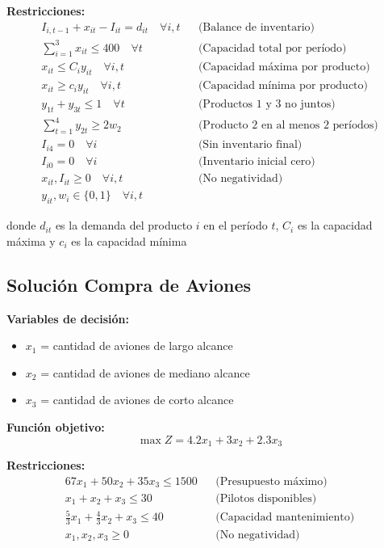 \documentclass[12pt]{article}
\begin{document}
\textbf{Restricciones:}
\begin{align*}
    I_{i,t-1} + x_{it} - I_{it} = d_{it} \quad \forall i,t && \text{(Balance de inventario)} \\
    \sum_{i=1}^{3} x_{it} \leq 400 \quad \forall t && \text{(Capacidad total por período)} \\
    x_{it} \leq C_i y_{it} \quad \forall i,t && \text{(Capacidad máxima por producto)} \\
    x_{it} \geq c_i y_{it} \quad \forall i,t && \text{(Capacidad mínima por producto)} \\
    y_{1t} + y_{3t} \leq 1 \quad \forall t && \text{(Productos 1 y 3 no juntos)} \\
    \sum_{t=1}^{4} y_{2t} \geq 2w_2 && \text{(Producto 2 en al menos 2 períodos)} \\
    I_{i4} = 0 \quad \forall i && \text{(Sin inventario final)} \\
    I_{i0} = 0 \quad \forall i && \text{(Inventario inicial cero)} \\
    x_{it}, I_{it} \geq 0 \quad \forall i,t && \text{(No negatividad)} \\
    y_{it}, w_i \in \{0,1\} \quad \forall i,t
\end{align*}
\begin{center}
donde $d_{it}$ es la demanda del producto $i$ en el período $t$, $C_i$ es la capacidad máxima y $c_i$ es la capacidad mínima
\end{center}

\subsection{Solución Compra de Aviones}

\textbf{Variables de decisión:}
\begin{itemize}
    \item $x_1$ = cantidad de aviones de largo alcance
    \item $x_2$ = cantidad de aviones de mediano alcance
    \item $x_3$ = cantidad de aviones de corto alcance
\end{itemize}

\textbf{Función objetivo:}
$$\max Z = 4.2x_1 + 3x_2 + 2.3x_3$$

\textbf{Restricciones:}
\begin{align*}
    67x_1 + 50x_2 + 35x_3 \leq 1500 && \text{(Presupuesto máximo)} \\
    x_1 + x_2 + x_3 \leq 30 && \text{(Pilotos disponibles)} \\
    \frac{5}{3}x_1 + \frac{4}{3}x_2 + x_3 \leq 40 && \text{(Capacidad mantenimiento)} \\
    x_1, x_2, x_3 \geq 0 && \text{(No negatividad)}
\end{align*}
\end{document}
